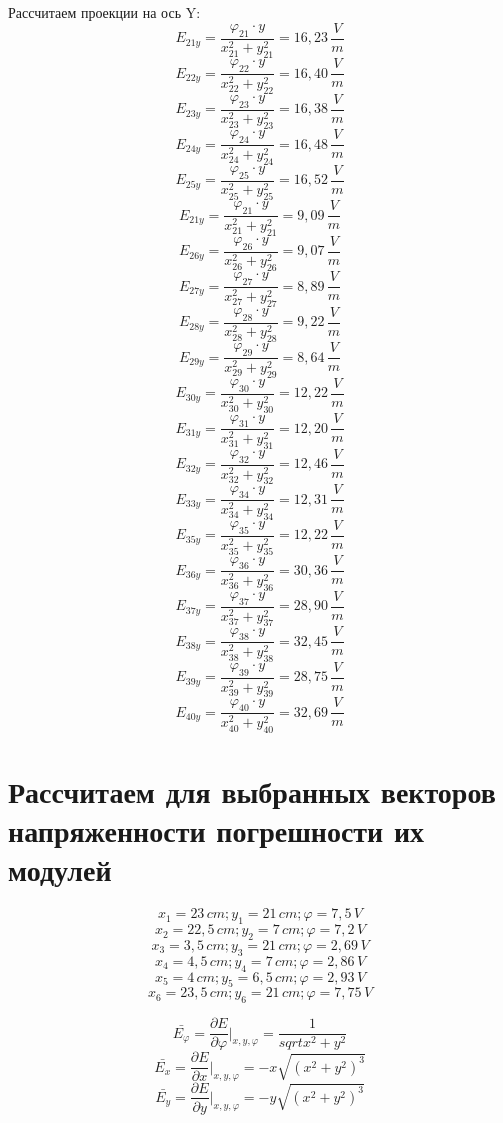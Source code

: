 \documentclass[a4paper,12pt]{report}
\begin{document}
Рассчитаем проекции на ось Y:
\[ E_{21y} = \frac{\varphi_{21}\cdot y}{x_{21}^2+y_{21}^2} = 16,23 \, \frac{V}{m} \]
\[ E_{22y} = \frac{\varphi_{22}\cdot y}{x_{22}^2+y_{22}^2} = 16,40 \, \frac{V}{m} \]
\[ E_{23y} = \frac{\varphi_{23}\cdot y}{x_{23}^2+y_{23}^2} = 16,38 \, \frac{V}{m} \]
\[ E_{24y} = \frac{\varphi_{24}\cdot y}{x_{24}^2+y_{24}^2} = 16,48 \, \frac{V}{m} \]
\[ E_{25y} = \frac{\varphi_{25}\cdot y}{x_{25}^2+y_{25}^2} = 16,52 \, \frac{V}{m} \]
\[ E_{21y} = \frac{\varphi_{21}\cdot y}{x_{21}^2+y_{21}^2} = 9,09 \, \frac{V}{m} \]
\[ E_{26y} = \frac{\varphi_{26}\cdot y}{x_{26}^2+y_{26}^2} = 9,07 \, \frac{V}{m} \]
\[ E_{27y} = \frac{\varphi_{27}\cdot y}{x_{27}^2+y_{27}^2} = 8,89 \, \frac{V}{m} \]
\[ E_{28y} = \frac{\varphi_{28}\cdot y}{x_{28}^2+y_{28}^2} = 9,22 \, \frac{V}{m} \]
\[ E_{29y} = \frac{\varphi_{29}\cdot y}{x_{29}^2+y_{29}^2} = 8,64 \, \frac{V}{m} \]
\[ E_{30y} = \frac{\varphi_{30}\cdot y}{x_{30}^2+y_{30}^2} = 12,22 \, \frac{V}{m} \]
\[ E_{31y} = \frac{\varphi_{31}\cdot y}{x_{31}^2+y_{31}^2} = 12,20 \, \frac{V}{m} \]
\[ E_{32y} = \frac{\varphi_{32}\cdot y}{x_{32}^2+y_{32}^2} = 12,46 \, \frac{V}{m} \]
\[ E_{33y} = \frac{\varphi_{34}\cdot y}{x_{34}^2+y_{34}^2} = 12,31 \, \frac{V}{m} \]
\[ E_{35y} = \frac{\varphi_{35}\cdot y}{x_{35}^2+y_{35}^2} = 12,22 \, \frac{V}{m} \]
\[ E_{36y} = \frac{\varphi_{36}\cdot y}{x_{36}^2+y_{36}^2} = 30,36 \, \frac{V}{m} \]
\[ E_{37y} = \frac{\varphi_{37}\cdot y}{x_{37}^2+y_{37}^2} = 28,90 \, \frac{V}{m} \]
\[ E_{38y} = \frac{\varphi_{38}\cdot y}{x_{38}^2+y_{38}^2} = 32,45 \, \frac{V}{m} \]
\[ E_{39y} = \frac{\varphi_{39}\cdot y}{x_{39}^2+y_{39}^2} = 28,75\, \frac{V}{m} \]
\[ E_{40y} = \frac{\varphi_{40}\cdot y}{x_{40}^2+y_{40}^2} = 32,69 \, \frac{V}{m} \]

\section*{Рассчитаем для выбранных векторов напряженности погрешности их модулей}

\[ x_1 = 23 \, cm; y_1 = 21 \, cm; \varphi = 7,5 \, V\]
\[ x_2 = 22,5 \, cm; y_2 = 7 \, cm ; \varphi = 7,2 \, V\]
\[ x_3 = 3,5 \, cm; y_3 = 21 \, cm; \varphi = 2,69 \, V \]
\[ x_4 = 4,5 \, cm; y_4 = 7 \, cm; \varphi = 2,86 \, V \]
\[ x_5 = 4 \, cm; y_5 = 6,5 \, cm; \varphi = 2,93 \, V \]
\[ x_6 = 23,5 \, cm; y_6 = 21 \, cm; \varphi = 7,75 \, V \]

\[ \bar{E_{\varphi}} = \frac{\partial E}{\partial \varphi}\bigg\vert_{x,y,\varphi} = \frac{1}{sqrt{x^2+y^2}}\]
\[ \bar{E_{x}} = \frac{\partial E}{\partial x}\bigg\vert_{x,y,\varphi} = -x\sqrt{(x^2+y^2)^3}\]
\[ \bar{E_{y}} = \frac{\partial E}{\partial y}\bigg\vert_{x,y,\varphi} = -y\sqrt{(x^2+y^2)^3}\]
\end{document}
